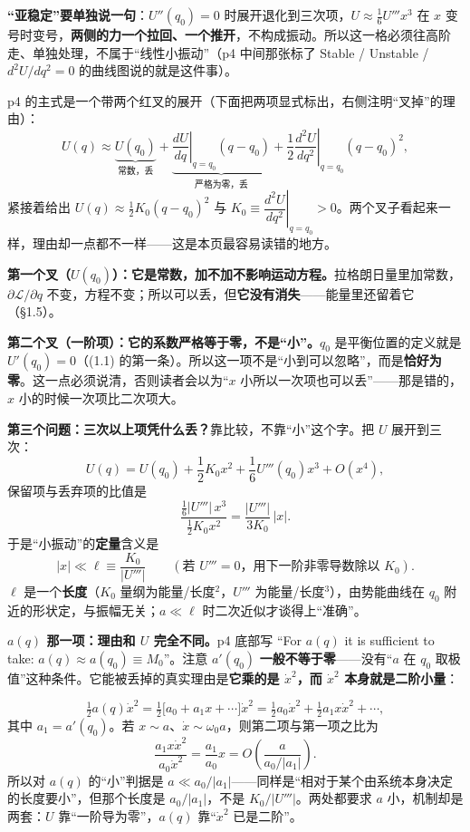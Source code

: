 \documentclass[11pt]{ctexart}
\begin{document}
\textbf{“亚稳定”要单独说一句}：$U''(q_0)=0$ 时展开退化到三次项，$U\approx\frac16U'''x^3$ 在 $x$ 变号时变号，\textbf{两侧的力一个拉回、一个推开}，不构成振动。所以这一格必须往高阶走、单独处理，不属于“线性小振动”（p4 中间那张标了 Stable / Unstable / $d^2U/dq^2=0$ 的曲线图说的就是这件事）。


p4 的主式是一个带两个红叉的展开（下面把两项显式标出，右侧注明“叉掉”的理由）：
\[
U(q)\approx
\underbrace{U(q_0)}_{\text{常数，丢}}
+\underbrace{\left.\frac{dU}{dq}\right|_{q=q_0}(q-q_0)}_{\text{严格为零，丢}}
+\frac12\left.\frac{d^2U}{dq^2}\right|_{q=q_0}(q-q_0)^2 ,
\tag{1.2}
\]
紧接着给出 $U(q)\approx\frac12K_0(q-q_0)^2$ 与 $K_0\equiv\left.\dfrac{d^2U}{dq^2}\right|_{q=q_0}>0$。两个叉子看起来一样，理由却一点都不一样——这是本页最容易读错的地方。

\textbf{第一个叉（$U(q_0)$）：它是常数，加不加不影响运动方程。}拉格朗日量里加常数，$\partial\mathcal{L}/\partial q$ 不变，方程不变；所以可以丢，但\textbf{它没有消失}——能量里还留着它（§1.5）。

\textbf{第二个叉（一阶项）：它的系数\textbf{严格}等于零，不是“小”。}$q_0$ 是平衡位置的定义就是 $U'(q_0)=0$（(1.1) 的第一条）。所以这一项不是“小到可以忽略”，而是\textbf{恰好为零}。这一点必须说清，否则读者会以为“$x$ 小所以一次项也可以丢”——那是错的，$x$ 小的时候一次项比二次项大。

\textbf{第三个问题：三次以上项凭什么丢？}靠比较，不靠“小”这个字。把 $U$ 展开到三次：
\[
U(q)=U(q_0)+\frac12K_0x^2+\frac16U'''(q_0)x^3+O(x^4),
\]
保留项与丢弃项的比值是
\[
\frac{\tfrac16|U'''|\,x^3}{\tfrac12K_0x^2}=\frac{|U'''|}{3K_0}\,|x| .
\]
于是“小振动”的\textbf{定量}含义是
\[
|x|\ll\ell\equiv\frac{K_0}{|U'''|}\qquad(\text{若 }U'''=0\text{，用下一阶非零导数除以 }K_0).
\tag{1.3}
\]
$\ell$ 是一个\textbf{长度}（$K_0$ 量纲为能量/长度$^2$，$U'''$ 为能量/长度$^3$），由势能曲线在 $q_0$ 附近的形状定，与振幅无关；$a\ll\ell$ 时二次近似才谈得上“准确”。

\textbf{$a(q)$ 那一项：理由和 $U$ 完全不同。}p4 底部写 “For $a(q)$ it is sufficient to take: $a(q)\approx a(q_0)\equiv M_0$”。注意 $a'(q_0)$ \textbf{一般不等于零}——没有“$a$ 在 $q_0$ 取极值”这种条件。它能被丢掉的真实理由是\textbf{它乘的是 $\dot x^2$，而 $\dot x^2$ 本身就是二阶小量}：

\[
\tfrac12a(q)\dot x^2=\tfrac12\bigl[a_0+a_1x+\cdots\bigr]\dot x^2
=\tfrac12a_0\dot x^2+\tfrac12a_1x\dot x^2+\cdots,
\]
其中 $a_1=a'(q_0)$。若 $x\sim a$、$\dot x\sim\omega_0 a$，则第二项与第一项之比为
\[
\frac{a_1x\dot x^2}{a_0\dot x^2}=\frac{a_1}{a_0}x=O\!\left(\frac{a}{a_0/|a_1|}\right).
\]
所以对 $a(q)$ 的“小”判据是 $a\ll a_0/|a_1|$——同样是“相对于某个由系统本身决定的长度要小”，但那个长度是 $a_0/|a_1|$，不是 $K_0/|U'''|$。两处都要求 $a$ 小，机制却是两套：$U$ 靠“一阶导为零”，$a(q)$ 靠“$\dot x^2$ 已是二阶”。
\end{document}
